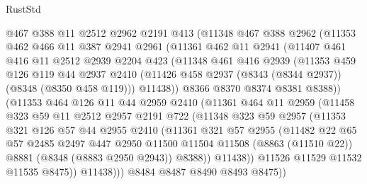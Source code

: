 \begin{lexlean}{RustStd}
\begin{coremodule}
{\begin{coremodule}
{{{{{{{{{{{{{{{{{{{{{{{{{{{{{{{{{{{{{{{{{{{{{{{{{{        @467
        @388
        @11
        @2512
        @2962
        @2191
        @413
        (@11348
          @467
          @388
          @2962
          (@11353
            @462
            @466
            @11
            @387
            @2941
            @2961
            (@11361
              @462
              @11
              @2941
              (@11407
                @461
                @416
                @11
                @2512
                @2939
                @2204
                @423
                (@11348
                  @461
                  @416
                  @2939
                  (@11353
                    @459
                    @126
                    @119
                    @44
                    @2937
                    @2410
                    (@11426 @458 @2937 (@8343 (@8344 @2937)) (@8348 (@8350 @458 @119)))
                    @11438))
                @8366
                @8370
                @8374
                @8381
                @8388))
            (@11353
              @464
              @126
              @11
              @44
              @2959
              @2410
              (@11361
                @464
                @11
                @2959
                (@11458
                  @323
                  @59
                  @11
                  @2512
                  @2957
                  @2191
                  @722
                  (@11348
                    @323
                    @59
                    @2957
                    (@11353
                      @321
                      @126
                      @57
                      @44
                      @2955
                      @2410
                      (@11361
                        @321
                        @57
                        @2955
                        (@11482
                          @22
                          @65
                          @57
                          @2485
                          @2497
                          @447
                          @2950
                          @11500
                          @11504
                          @11508
                          (@8863 (@11510 @22))
                          @8881
                          (@8348 (@8883 @2950 @2943))
                          @8388))
                      @11438))
                  @11526
                  @11529
                  @11532
                  @11535
                  @8475))
              @11438)))
        @8484
        @8487
        @8490
        @8493
        @8475))
}}}}}}}}}}}}}}}}}}}}}}}}}}}}}}}}}}}}}}}}}}}}}}}}}}
\end{coremodule}}
\end{coremodule}
\end{lexlean}
